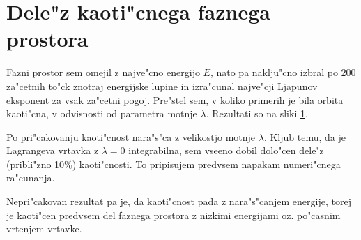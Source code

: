 \documentclass[a4paper,10pt]{article}
\begin{document}
\section{Dele"z kaoti"cnega faznega prostora}

Fazni prostor sem omejil z najve"cno energijo $E$, nato pa naklju"cno izbral po 200 za"cetnih to"ck znotraj energijske lupine in izra"cunal najve"cji Ljapunov eksponent za vsak za"cetni pogoj. Pre"stel sem, v koliko primerih je bila orbita kaoti"cna, v odvisnosti od parametra motnje $\lambda$. Rezultati so na sliki \ref{fig:kaos}. 

\begin{figure}[H]
 \label{fig:kaos}
 
\end{figure}

Po pri"cakovanju kaoti"cnost nara"s"ca z velikostjo motnje $\lambda$. Kljub temu, da je Lagrangeva vrtavka z $\lambda=0$ integrabilna, sem vseeno dobil dolo"cen dele"z (pribli"zno 10\%) kaoti"cnosti. To pripisujem predvsem napakam numeri"cnega ra"cunanja. 

Nepri"cakovan rezultat pa je, da kaoti"cnost pada z nara"s"canjem energije, torej je kaoti"cen predvsem del faznega prostora z nizkimi energijami oz. po"casnim vrtenjem vrtavke. 
\end{document}
